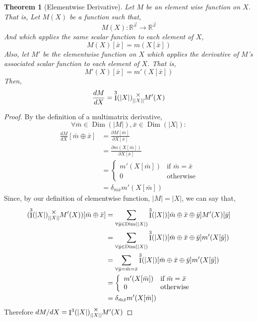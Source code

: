 \documentclass[12pt]{book}
\theoremstyle{plain}
\newtheorem{theorem}{Theorem}[chapter]
\theoremstyle{definition}
\theoremstyle{ppart}
\theoremstyle{case}
\theoremstyle{solution}
\DeclareMathOperator{\Dim}{Dim}
\DeclareMathOperator{\Ident}{I}
\newcommand{\mmult}[1]{\text{\raisebox{1ex}{$\underset{#1}{\times}$}}}
\newcommand{\shape}[1]{\left|#1\right|}
\begin{document}
\begin{theorem}[Elementwise Derivative]
\label{elementwise_derivative}
Let $M$ be an element wise function on $X$. That is, Let $M(X)$ be a function
such that,
\[ M(X) : \mathbb{R}^{\vec{x}} \to \mathbb{R}^{\vec{x}} \]
And which applies the same scalar function to each element of $X$, 
\[ M(X)[\bar{x}] = m(X[\bar{x}]) \]
Also, let $M'$ be the elementwise function on $X$ which applies the derivative
of $M$'s associated scalar function to each element of $X$. That is,
\[ M'(X)[\bar{x}] = m'(X[\bar{x}]) \]
Then,
\[ \frac{dM}{dX} = \Ident^3(\shape{X}) \mmult{\shape{\shape{X}}} M'(X) \]
\end{theorem}
\begin{proof}
By the definition of a multimatrix derivative,
\[ \forall \bar{m} \in \Dim(\shape{M}), \bar{x} \in \Dim(\shape{X}) : \]
\begin{align*}
 \frac{dM}{dX}[\bar{m} \oplus \bar{x}]
 &= \frac{\partial M[\bar{m}]}{\partial X[\bar{x}]} \\
 &= \frac{\partial m(X[\bar{m}])}{\partial X[\bar{x}]} \\
 &= \left\{
  \begin{array}{ll}
    m'(X[\bar{m}]) & \mbox{if } \bar{m} = \bar{x} \\
    0 & \mbox{otherwise}
  \end{array}
 \right. \\
 &= \delta_{\bar{m} \bar{x}} m'(X[\bar{m}])
\end{align*}
Since, by our definition of elementwise function, $\shape{M} = \shape{X}$, we can
say that, 
\begin{align*}
 (\Ident^3(\shape{X}) \mmult{\shape{\shape{X}}} M'(X))[\bar{m} \oplus \bar{x}]
 &= \sum_{\forall \bar{y} \in \Dim(\shape{X})}
 \Ident^3(\shape{X})[\bar{m} \oplus \bar{x} \oplus \bar{y}] M'(X)[\bar{y}] \\
 &= \sum_{\forall \bar{y} \in \Dim(\shape{X})}
 \Ident^3(\shape{X})[\bar{m} \oplus \bar{x} \oplus \bar{y}] m'(X[\bar{y}]) \\
 &= \sum_{\forall \bar{y} = \bar{m} = \bar{x}}
 \Ident^3(\shape{X})[\bar{m} \oplus \bar{x} \oplus \bar{y}] m'(X[\bar{y}]) \\
 &= \left\{
  \begin{array}{ll}
    m'(X[\bar{m}]) & \mbox{if } \bar{m} = \bar{x} \\
    0 & \mbox{otherwise}
  \end{array}
 \right. \\
 &= \delta_{\bar{m} \bar{x}} m'(X[\bar{m}])
\end{align*}
Therefore $dM/dX = \Ident^3(\shape{X}) \mmult{\shape{\shape{X}}} M'(X)$
\end{proof}
\end{document}
